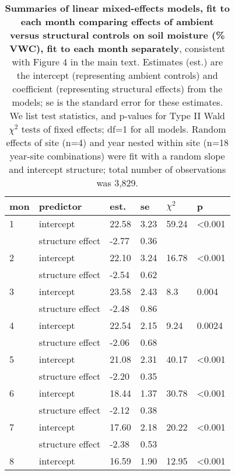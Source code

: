 \documentclass{article}
\begin{document}
\begin{table}[ht]
\centering
\caption{\textbf{Summaries of linear mixed-effects models, fit to each month comparing effects of ambient versus structural controls on soil moisture (\% VWC), fit to each month separately}, consistent with Figure 4 in the main text. Estimates (est.) are the intercept (representing ambient controls) and coefficient (representing structural effects) from the models; se is the standard error for these estimates. We list test statistics, and p-values for Type II Wald $\chi^{2}$ tests of fixed effects; df=1 for all models. Random effects of site (n=4) and year nested within site (n=18 year-site combinations) were fit with a random slope and intercept structure; total number of observations was 3,829.} 
\label{table:shamamb_soilmoism}
\begingroup\footnotesize
\begin{tabular}{|p{}|p{}p{}p{}p{}p{}|}
  \hline
mon & predictor & est. & se & $\chi^2$ & p \\ 
  \hline
  1 & intercept & 22.58 & 3.23 & 59.24 & <0.001 \\ 
   & structure effect & -2.77 & 0.36 &  &  \\ 
   \hline
  2 & intercept & 22.10 & 3.24 & 16.78 & <0.001 \\ 
   & structure effect & -2.54 & 0.62 &  &  \\ 
   \hline
  3 & intercept & 23.58 & 2.43 & 8.3 & 0.004 \\ 
   & structure effect & -2.48 & 0.86 &  &  \\ 
   \hline
  4 & intercept & 22.54 & 2.15 & 9.24 & 0.0024 \\ 
   & structure effect & -2.06 & 0.68 &  &  \\ 
   \hline
  5 & intercept & 21.08 & 2.31 & 40.17 & <0.001 \\ 
   & structure effect & -2.20 & 0.35 &  &  \\ 
   \hline
  6 & intercept & 18.44 & 1.37 & 30.78 & <0.001 \\ 
   & structure effect & -2.12 & 0.38 &  &  \\ 
   \hline
  7 & intercept & 17.60 & 2.18 & 20.22 & <0.001 \\ 
   & structure effect & -2.38 & 0.53 &  &  \\ 
   \hline
  8 & intercept & 16.59 & 1.90 & 12.95 & <0.001 \\ 

\end{tabular}
\end{table}
\end{document}
